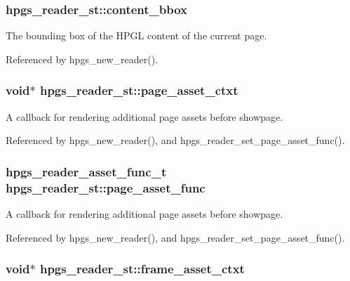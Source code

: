 \subsubsection[content\_\-bbox]{ {\bf hpgs\_\-reader\_\-st::content\_\-bbox}}\label{structhpgs__reader__st_dde90c67f5592eb707127dda52e7f1af}


The bounding box of the HPGL content of the current page. 

Referenced by hpgs\_\-new\_\-reader().
\subsubsection[page\_\-asset\_\-ctxt]{\setlength{\rightskip}{0pt plus 5cm}void$\ast$ {\bf hpgs\_\-reader\_\-st::page\_\-asset\_\-ctxt}}\label{structhpgs__reader__st_51299fdec828aae63911855615d3abf6}


A callback for rendering additional page assets before showpage. 

Referenced by hpgs\_\-new\_\-reader(), and hpgs\_\-reader\_\-set\_\-page\_\-asset\_\-func().
\subsubsection[page\_\-asset\_\-func]{\setlength{\rightskip}{0pt plus 5cm}hpgs\_\-reader\_\-asset\_\-func\_\-t {\bf hpgs\_\-reader\_\-st::page\_\-asset\_\-func}}\label{structhpgs__reader__st_489a8be5a1404f6442db2bcb979f8e04}


A callback for rendering additional page assets before showpage. 

Referenced by hpgs\_\-new\_\-reader(), and hpgs\_\-reader\_\-set\_\-page\_\-asset\_\-func().
\subsubsection[frame\_\-asset\_\-ctxt]{\setlength{\rightskip}{0pt plus 5cm}void$\ast$ {\bf hpgs\_\-reader\_\-st::frame\_\-asset\_\-ctxt}}\label{structhpgs__reader__st_6750637d9d21d8e91d9bd3fe4fbd22f2}


